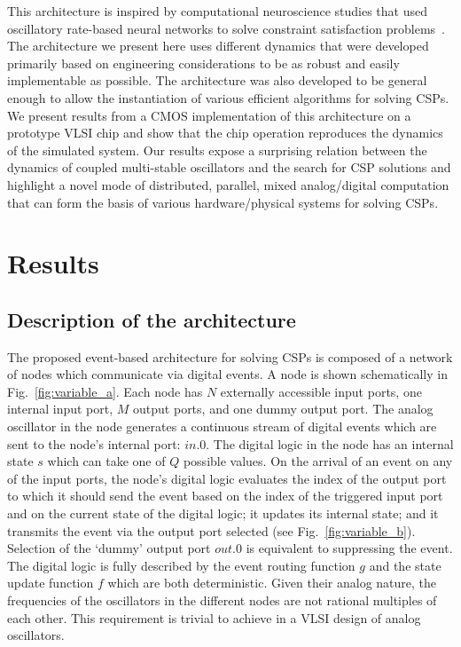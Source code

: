 \documentclass[10pt]{article}
\begin{document}
This architecture is inspired by computational neuroscience studies that used oscillatory rate-based neural networks to solve constraint satisfaction problems~\cite{Mostafa_etal13b}. The architecture we present here uses different dynamics that were developed primarily based on engineering considerations to be as robust and easily implementable as possible. The architecture was also developed to be general enough to allow the instantiation of various efficient algorithms for solving CSPs. We present results from a CMOS implementation of this architecture on a prototype VLSI chip and show that the chip operation reproduces the dynamics of the simulated system.
Our results expose a surprising relation between the dynamics of coupled multi-stable oscillators and the search for CSP solutions and highlight a novel mode of distributed, parallel, mixed analog/digital computation that can form the basis of various hardware/physical systems for solving CSPs.








\section*{Results}
\subsection*{Description of the architecture}

The proposed event-based architecture for solving CSPs is composed of a network of nodes which communicate via digital events. A node is shown schematically in Fig.~\ref{fig:variable_a}. Each node has $N$ externally accessible input ports, one internal input port, $M$ output ports, and one dummy output port. The analog oscillator in the node generates a continuous stream of digital events which are sent to the node's internal port: $in.0$. The digital logic in the node has an internal state $s$ which can take one of $Q$ possible values. On the arrival of an event on any of the input ports, the node's digital logic evaluates the index of the output port to which it should send the event based on the index of the triggered input port and on the current state of the digital logic; it updates its internal state; and it transmits the event via the output port selected (see Fig.~\ref{fig:variable_b}). Selection of the `dummy' output port $out.0$ is equivalent to suppressing the event. The digital logic is fully described by the event routing function $g$ and the state update function $f$ which are both deterministic. Given their analog nature, the frequencies of the oscillators in the different nodes are not rational multiples of each other. This requirement is trivial to achieve in a VLSI design of analog oscillators. 
\end{document}
